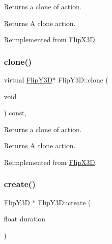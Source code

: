 Returns a clone of action.

\begin{DoxyReturn}{Returns}
A clone action. 
\end{DoxyReturn}


Reimplemented from \hyperlink{classFlipX3D_a3c8f037e07f76fbccb63a960c763a947}{Flip\+X3D}.

\mbox{\label{classFlipY3D_a4553fc238ade03f1926ba12458ad073b}} 
\subsubsection{\texorpdfstring{clone()}{clone()}\hspace{0.1cm}{\footnotesize\ttfamily [2/2]}}
{\footnotesize\ttfamily virtual \hyperlink{classFlipY3D}{Flip\+Y3D}$\ast$ Flip\+Y3\+D\+::clone (\begin{DoxyParamCaption}\item[{void}]{ }\end{DoxyParamCaption}) const\hspace{0.3cm}{\ttfamily [override]}, {\ttfamily [virtual]}}

Returns a clone of action.

\begin{DoxyReturn}{Returns}
A clone action. 
\end{DoxyReturn}


Reimplemented from \hyperlink{classFlipX3D_a3c8f037e07f76fbccb63a960c763a947}{Flip\+X3D}.

\mbox{\label{classFlipY3D_a5c6d047f9fb65c70ba71a94a675307db}} 
\subsubsection{\texorpdfstring{create()}{create()}\hspace{0.1cm}{\footnotesize\ttfamily [1/2]}}
{\footnotesize\ttfamily \hyperlink{classFlipY3D}{Flip\+Y3D} $\ast$ Flip\+Y3\+D\+::create (\begin{DoxyParamCaption}\item[{float}]{duration }\end{DoxyParamCaption})\hspace{0.3cm}{\ttfamily [static]}}



